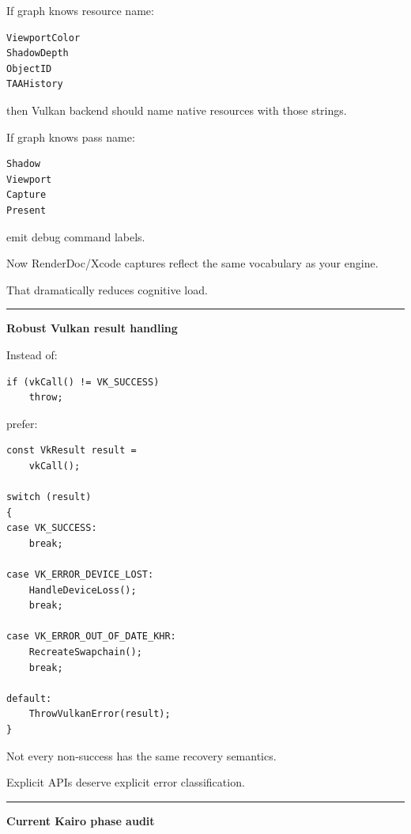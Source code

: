 If graph knows resource name:

\begin{verbatim}
ViewportColor
ShadowDepth
ObjectID
TAAHistory
\end{verbatim}

then Vulkan backend should name native resources with those strings.

If graph knows pass name:

\begin{verbatim}
Shadow
Viewport
Capture
Present
\end{verbatim}

emit debug command labels.

Now RenderDoc/Xcode captures reflect the same vocabulary as your engine.

That dramatically reduces cognitive load.

\begin{center}\rule{0.5\linewidth}{0.5pt}\end{center}

\textbf{Robust Vulkan result handling}

Instead of:

\begin{verbatim}
if (vkCall() != VK_SUCCESS)
    throw;
\end{verbatim}

prefer:

\begin{verbatim}
const VkResult result =
    vkCall();

switch (result)
{
case VK_SUCCESS:
    break;

case VK_ERROR_DEVICE_LOST:
    HandleDeviceLoss();
    break;

case VK_ERROR_OUT_OF_DATE_KHR:
    RecreateSwapchain();
    break;

default:
    ThrowVulkanError(result);
}
\end{verbatim}

Not every non-success has the same recovery semantics.

Explicit APIs deserve explicit error classification.

\begin{center}\rule{0.5\linewidth}{0.5pt}\end{center}

\textbf{Current Kairo phase audit}

